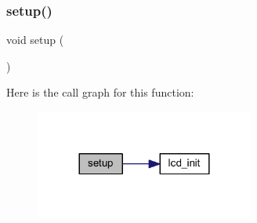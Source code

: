 \subsubsection{\texorpdfstring{setup()}{setup()}}
{\footnotesize\ttfamily void setup (\begin{DoxyParamCaption}{ }\end{DoxyParamCaption})}

Here is the call graph for this function\+:
\nopagebreak
\begin{figure}[H]
\begin{center}
\leavevmode
\includegraphics[width=204pt]{d9/d17/evive_8ino_a4fc01d736fe50cf5b977f755b675f11d_cgraph}
\end{center}
\end{figure}
